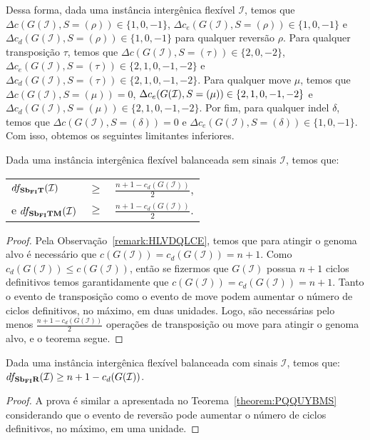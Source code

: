 Dessa forma, dada uma instância intergênica flexível $\mathcal{I}$, temos que $\Delta c(G(\mathcal{I}), S=(\rho)) \in \{1,0,-1\}$, $\Delta c_e(G(\mathcal{I}), S=(\rho)) \in \{1,0,-1\}$ e $\Delta c_d(G(\mathcal{I}), S=(\rho)) \in \{1,0,-1\}$ para qualquer reversão $\rho$. Para qualquer transposição $\tau$, temos que $\Delta c(G(\mathcal{I}), S=(\tau)) \in \{2,0,-2\}$, $\Delta c_e(G(\mathcal{I}), S=(\tau)) \in \{2,1,0,-1,-2\}$ e $\Delta c_d(G(\mathcal{I}), S=(\tau)) \in \{2,1,0,-1,-2\}$. Para qualquer move $\mu$, temos que $\Delta c(G(\mathcal{I}), S=(\mu)) = 0$, $\Delta c_e(G(\mathcal{I}), S=(\mu)) \in \{2,1,0,-1,\break-2\}$ e $\Delta c_d(G(\mathcal{I}), S=(\mu)) \in \{2,1,0,-1,-2\}$. Por fim, para qualquer indel $\delta$, temos que $\Delta c(G(\mathcal{I}), S=(\delta)) = 0$ e $\Delta c_e(G(\mathcal{I}), S=(\delta)) \in \{1,0,{-1}\}$. Com isso, obtemos os seguintes limitantes inferiores.

\begin{theorem}\label{theorem:PQQUYBMS}
Dada uma instância intergênica flexível balanceada sem sinais $\mathcal{I}$, temos que:

\begin{tabular}{lll}
  $df_{\textbf{Sb\textsubscript{FI}T}}(\mathcal{I})$      & $ \ge $ & $\frac{{n+1} - c_d(G(\mathcal{I} ))}{2}$, \\
  e $df_{\textbf{Sb\textsubscript{FI}TM}}(\mathcal{I})$   & $ \ge $ & $\frac{{n+1} - c_d(G(\mathcal{I} ))}{2}$. \\
\end{tabular}
\end{theorem}
\begin{proof}
Pela Observação~\ref{remark:HLVDQLCE}, temos que para atingir o genoma alvo é necessário que $c(G(\mathcal{I})) = c_d(G(\mathcal{I})) = n+1$. Como $c_d(G(\mathcal{I})) \le c(G(\mathcal{I}))$, então se fizermos que $G(\mathcal{I})$ possua $n+1$ ciclos definitivos temos garantidamente que $c(G(\mathcal{I})) = c_d(G(\mathcal{I})) = n+1$. Tanto o evento de transposição como o evento de move podem aumentar o número de ciclos definitivos, no máximo, em duas unidades. Logo, são necessárias pelo menos $\frac{{n+1} - c_d(G(\mathcal{I} ))}{2}$ operações de transposição ou move para atingir o genoma alvo, e o teorema segue. 
\end{proof}

\begin{theorem}\label{theorem:EUNBEQEX}
Dada uma instância intergênica flexível balanceada com sinais $\mathcal{I}$, temos que: $df_{\textbf{Sb\textsubscript{FI}R}}(\mathcal{I}) \ge {n+1} - c_d(G(\mathcal{I} ))$.
\end{theorem}
\begin{proof}
A prova é similar a apresentada no Teorema~\ref{theorem:PQQUYBMS} considerando que o evento de reversão pode aumentar o número de ciclos definitivos, no máximo, em uma unidade.
\end{proof}

